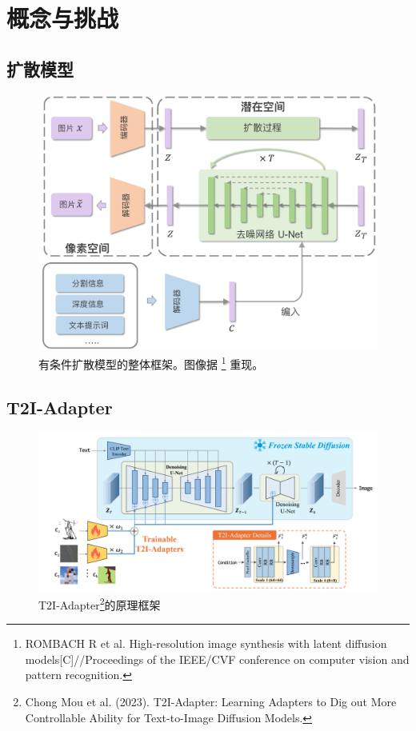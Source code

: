 \documentclass[
    fontset=fandol,
    xcolor=svgnames %
]{ctexbeamer}
\begin{document}
\section{概念与挑战}

\subsection{扩散模型}
\begin{frame}
    \begin{figure}[h]
\centering
\includegraphics[width=0.7\linewidth]{figures/diffusion_conditional.pdf}
\caption{有条件扩散模型的整体框架。图像据 \footnote{ROMBACH R et al. High-resolution image synthesis with
latent diffusion models[C]//Proceedings of the IEEE/CVF conference on computer vision and
pattern recognition. } 重现。}
\label{diffusion_conditional}
\end{figure}
\end{frame}
\subsection{T2I-Adapter}
\begin{frame}
    \begin{figure}[h]
\centering
\includegraphics[width=0.95\linewidth]{image/t2iadaper.png}
\caption{T2I-Adapter\footnote{
Chong Mou et al. (2023). T2I-Adapter: Learning Adapters to Dig out More Controllable Ability for Text-to-Image Diffusion Models.
}的原理框架}
\label{diffusion_conditional}
\end{figure}
\end{frame}
\end{document}
